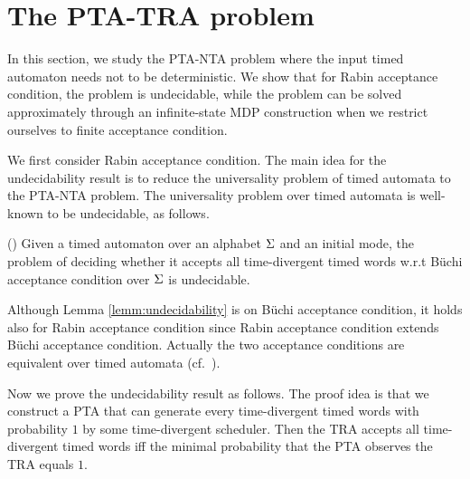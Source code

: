 \section{The PTA-TRA problem}
In this section, we study the PTA-NTA problem where the input timed automaton needs not to be deterministic.
We show that for Rabin acceptance condition, the problem is undecidable, while the problem can be solved approximately through an infinite-state MDP construction when we restrict ourselves to finite acceptance condition.

We first consider Rabin acceptance condition. The main idea for the undecidability result is to reduce the universality problem of timed automata to the PTA-NTA problem. The universality problem over timed automata is well-known to be undecidable, as follows.

%
%
\begin{lemma}{(\cite[Theorem 5.2]{DBLP:conf/tapsoft/Vaandrager97})}\label{lemm:undecidability}
Given a timed automaton over an alphabet $\Sigma$ and an initial mode, the problem of deciding whether it accepts all time-divergent timed words w.r.t B\"{u}chi acceptance condition over $\Sigma$ is undecidable.
\end{lemma}
%
Although Lemma \ref{lemm:undecidability} is on  B\"{u}chi acceptance condition, it holds also for Rabin acceptance condition since Rabin acceptance condition extends  B\"{u}chi acceptance condition.
Actually the two acceptance conditions are equivalent over timed automata (cf.~\cite[Theorem 3.20]{DBLP:conf/tapsoft/Vaandrager97}).

Now we prove the undecidability result as follows.
The proof idea is that we construct a PTA that can generate every time-divergent timed words with probability $1$ by some time-divergent scheduler.
Then the TRA accepts all time-divergent timed words iff the minimal probability that the PTA observes the TRA equals $1$.

